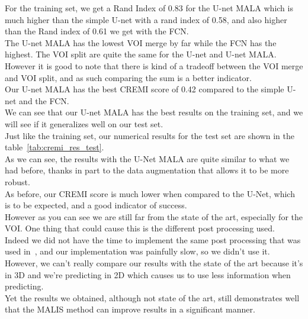 For the training set, we get a Rand Index of 0.83 for the U-net MALA which is much higher than the simple U-net with a rand index of 0.58, and also higher than the Rand index of 0.61 we get with the FCN.\\
The U-net MALA has the lowest VOI merge by far while the FCN has the highest. The VOI split are quite the same for the U-net and U-net MALA.\\
However it is good to note that there is kind of a tradeoff between the VOI merge and VOI split, and as such comparing the sum is a better indicator.\\
Our U-net MALA has the best CREMI score of 0.42 compared to the simple U-net and the FCN.\\ 
We can see that our U-net MALA has the best results on the training set, and we
will see if it generalizes well on our test set.\\

Just like the training set, our numerical results for the test set are shown in the table~\ref{tab:cremi_res_test}.\\
As we can see, the results with the U-Net MALA are quite similar to what we had before, thanks in part to the data augmentation that allows it to be more robust.\\
As before, our CREMI score is much lower when compared to the U-Net, which is to be expected, and a good indicator of success.\\

However as you can see we are still far from the state of the art, especially for the VOI. One thing that could cause this is the different post processing used.\\ 
Indeed we did not have the time to implement the same post processing that was
used in~\cite{funke_large_2019}, and our implementation was painfully slow, so
we didn't use it.\\
However, we can’t really compare our results with the state of the art because it’s in 3D and we’re predicting in 2D which causes us to use less information when predicting.\\
Yet the results we obtained, although not state of the art, still demonstrates
well that the MALIS method can improve results in a significant manner.\\
